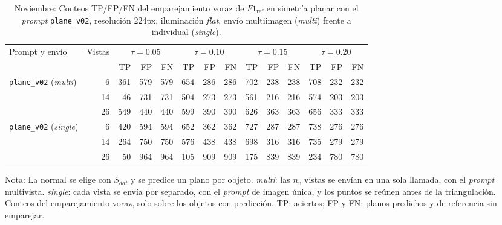 \begin{table}[htbp]
\centering
\caption{Noviembre: Conteos TP/FP/FN del emparejamiento voraz de $F1_{\mathrm{ref}}$ en simetría planar con el \textit{prompt} \texttt{plane\_v02}, resolución 224px, iluminación \textit{flat}, envío multiimagen (\textit{multi}) frente a individual (\textit{single}).}
\label{tab:nov_plane_v02_modo_envio_conteos}
\begin{lrbox}{\tablebox}
\begin{adjustbox}{max width=\textwidth}
\begin{tabular}{lrrrrrrrrrrrrr}
\toprule
\multirow{2}{*}{Prompt y envío} & \multirow{2}{*}{Vistas} & \multicolumn{3}{c}{$\tau{=}0.05$} & \multicolumn{3}{c}{$\tau{=}0.10$} & \multicolumn{3}{c}{$\tau{=}0.15$} & \multicolumn{3}{c}{$\tau{=}0.20$} \\
\cmidrule(lr){3-5} \cmidrule(lr){6-8} \cmidrule(lr){9-11} \cmidrule(lr){12-14}
 &  & TP & FP & FN & TP & FP & FN & TP & FP & FN & TP & FP & FN \\
\midrule
\multirow{3}{*}{\texttt{plane\_v02} (\textit{multi})} & 6 & 361 & 579 & 579 & 654 & 286 & 286 & 702 & 238 & 238 & 708 & 232 & 232 \\
 & 14 & 46 & 731 & 731 & 504 & 273 & 273 & 561 & 216 & 216 & 574 & 203 & 203 \\
 & 26 & 549 & 440 & 440 & 599 & 390 & 390 & 626 & 363 & 363 & 656 & 333 & 333 \\
\midrule
\multirow{3}{*}{\texttt{plane\_v02} (\textit{single})} & 6 & 420 & 594 & 594 & 652 & 362 & 362 & 727 & 287 & 287 & 738 & 276 & 276 \\
 & 14 & 264 & 750 & 750 & 576 & 438 & 438 & 698 & 316 & 316 & 735 & 279 & 279 \\
 & 26 & 50 & 964 & 964 & 105 & 909 & 909 & 175 & 839 & 839 & 234 & 780 & 780 \\
\bottomrule
\end{tabular}
\end{adjustbox}
\end{lrbox}
\usebox{\tablebox}

\vspace{1.5ex}
\begin{minipage}{\wd\tablebox}
\footnotesize
Nota: La normal se elige con $S_{dat}$ y se predice un plano por objeto. \textit{multi}: las $n_v$ vistas se envían en una sola llamada, con el \textit{prompt} multivista. \textit{single}: cada vista se envía por separado, con el \textit{prompt} de imagen única, y los puntos se reúnen antes de la triangulación. Conteos del emparejamiento voraz, solo sobre los objetos con predicción. TP: aciertos; FP y FN: planos predichos y de referencia sin emparejar.
\end{minipage}
\end{table}

